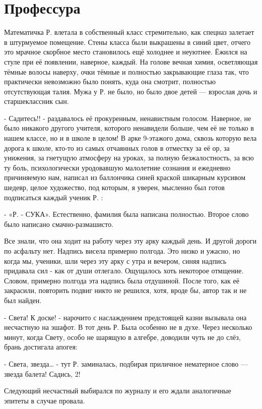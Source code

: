 \section*{Профессура}

Математичка Р. влетала в собственный класс стремительно, как спецназ залетает в штурмуемое помещение. Стены класса были выкрашены в синий цвет, отчего это мрачное скорбное место становилось ещё холоднее и неуютнее. Ёжился на стуле при её появлении, наверное, каждый. На голове вечная химия, осветляющая тёмные волосы наверху, очки тёмные и полностью закрывающие глаза так, что практически невозможно было понять, куда она смотрит, полностью отсутствующая талия. Мужа у Р. не было, но было двое детей — взрослая дочь и старшеклассник сын.

- Садитесь!! - раздавалось её прокуренным, ненавистным голосом. Наверное, не было никакого другого учителя, которого ненавидели больше, чем её не только в нашем классе, но и в школе в целом! В арке 9-этажого дома, сквозь которую вела дорога к школе, кто-то из самых отчаянных голов в отместку за её ор, за унижения, за гнетущую атмосферу на уроках, за полную безжалостность, за всю ту боль, психологически уродовавшую малолетние сознания и ежедневно причиняемую нам, написал из баллончика синей краской шикарным курсивом шедевр, целое художество, под которым, я уверен, мысленно был готов подписаться каждый ученик Р. :

- «Р. - СУКА». Естественно, фамилия была написана полностью. Второе слово было написано смачно-размашисто.

Все знали, что она ходит на работу через эту арку каждый день. И другой дороги по асфальту нет. Надпись висела примерно полгода. Это низко и ужасно, но когда мы, ученики, шли через эту арку с утра и вечером, синяя надпись придавала сил - как от души отлегало. Ощущалось хоть некоторое отмщение. Словом, примерно полгода эта надпись была отдушиной. После того, как её закрасили, повторить подвиг никто не решился, хотя, вроде бы, автор так и не был найден.

- Света! К доске! - нарочито с наслаждением предстоящей казни вызывала она несчастную на эшафот. В тот день Р. Была особенно не в духе. Через несколько минут, когда Свету, особо не шарящую в алгебре, доводили чуть не до слёз, брань достигала апогея:

- Света, звезда… - тут Р. заминалась, подбирая приличное нематерное слово — звезда балета! Садись, 2!

Следующий несчастный выбирался по журналу и его ждали аналогичные эпитеты в случае провала.	

